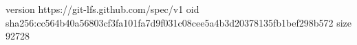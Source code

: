 version https://git-lfs.github.com/spec/v1
oid sha256:cc564b40a56803cf3fa101fa7d9f031c08cee5a4b3d20378135fb1bef298b572
size 92728
